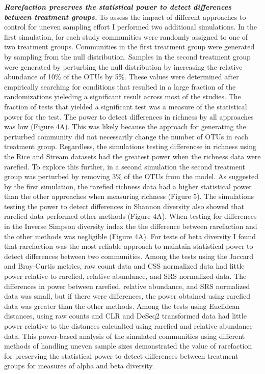 \documentclass[
]{article}
\begin{document}
\textbf{\emph{Rarefaction preserves the statistical power to detect
differences between treatment groups.}} To assess the impact of
different approaches to control for uneven sampling effort I performed
two additional simulations. In the first simulation, for each study
communities were randomly assigned to one of two treatment groups.
Communities in the first treatment group were generated by sampling from
the null distribution. Samples in the second treatment group were
generated by perturbing the null distribution by increasing the relative
abundance of 10\% of the OTUs by 5\%. These values were determined after
empirically searching for conditions that resulted in a large fraction
of the randomizations yieleding a significant result across most of the
studies. The fraction of tests that yielded a significant test was a
measure of the statistical power for the test. The power to detect
differences in richness by all approaches was low (Figure 4A). This was
likely because the approach for generating the perturbed community did
not necessarily change the number of OTUs in each treatment group.
Regardless, the simulations testing differencse in richness using the
Rice and Stream datasets had the greatest power when the richness data
were rarefied. To explore this further, in a second simulation the
second treatment group was perturbed by removing 3\% of the OTUs from
the model. As suggested by the first simulation, the rarefied richness
data had a higher statistical power than the other approaches when
measuring richness (Figure 5). The simulations testing the power to
detect differences in Shannon diversity also showed that rarefied data
performed other methods (Figure 4A). When testing for differences in the
Inverse Simpson diversity index the the difference between rarefaction
and the other methods was negligible (Figure 4A). For tests of beta
diversity I found that rarefaction was the most reliable approach to
maintain statistical power to detect differences between two
communities. Among the tests using the Jaccard and Bray-Curtis metrics,
raw count data and CSS normalized data had little power relative to
rarefied, relative abundance, and SRS normalized data. The differences
in power between rarefied, relative abundance, and SRS normalized data
was small, but if there were differences, the power obtained using
rarefied data was greater than the other methods. Among the tests using
Euclidean distances, using raw counts and CLR and DeSeq2 transformed
data had little power relative to the distances calcualted using
rarefied and relative abundance data. This power-based analysis of the
simulated communities using different methods of handling uneven sample
sizes demonstrated the value of rarefaction for preserving the
statistical power to detect differences between treatment groups for
measures of alpha and beta diversity.
\end{document}
